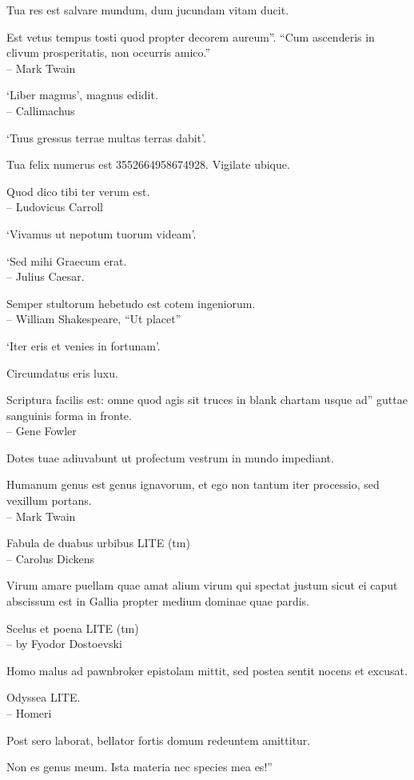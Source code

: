 \documentclass[titlepage,12pt]{memoir}
\begin{document}
Tua res est salvare mundum, dum jucundam vitam ducit.

Est vetus tempus tosti quod propter decorem aureum”.
“Cum ascenderis in clivum prosperitatis, non occurris amico.”
\\-- Mark Twain

‘Liber magnus’, magnus edidit.
\\-- Callimachus

‘Tuus gressus terrae multas terras dabit’.

Tua felix numerus est 3552664958674928. Vigilate ubique.

Quod dico tibi ter verum est.
\\-- Ludovicus Carroll

‘Vivamus ut nepotum tuorum videam’.

‘Sed mihi Graecum erat.
\\-- Julius Caesar.

Semper stultorum hebetudo est cotem ingeniorum.
\\-- William Shakespeare, “Ut placet”

‘Iter eris et venies in fortunam’.

 Circumdatus eris luxu.

Scriptura facilis est: omne quod agis sit truces in blank chartam usque ad”
guttae sanguinis forma in fronte.
\\-- Gene Fowler

Dotes tuae adiuvabunt ut profectum vestrum in mundo impediant.

Humanum genus est genus ignavorum, et ego non tantum iter
processio, sed vexillum portans.
\\-- Mark Twain

Fabula de duabus urbibus LITE (tm)
\\-- Carolus Dickens

Virum amare puellam quae amat alium virum qui spectat justum
sicut ei caput abscissum est in Gallia propter medium
dominae quae pardis.

Scelus et poena LITE (tm)
\\-- by Fyodor Dostoevski

Homo malus ad pawnbroker epistolam mittit, sed postea
sentit nocens et excusat.

Odyssea LITE.
\\-- Homeri

Post sero laborat, bellator fortis domum redeuntem amittitur.

Non es genus meum. Ista materia nec species mea es!”
\end{document}
